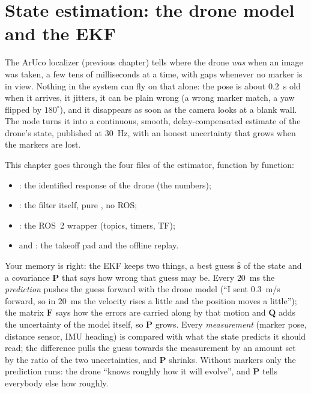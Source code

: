 \chapter{State estimation: the drone model and the EKF}
\label{ch:ekf}
\sloppy

The ArUco localizer (previous chapter) tells where the drone \emph{was} when an image was taken, a few tens of
milliseconds at a time, with gaps whenever no marker is in view. Nothing in the system can fly on that alone: the pose
is about $0.2$~s old when it arrives, it jitters, it can be plain wrong (a wrong marker match, a yaw flipped by
$180^\circ$), and it disappears as soon as the camera looks at a blank wall. The node  turns it into a
continuous, smooth, delay-compensated estimate of the drone's state, published at $30$~Hz, with an honest uncertainty
that grows when the markers are lost.

This chapter goes through the four files of the estimator, function by function:
\begin{itemize}[nosep]
  \item {}: the identified response of the drone (the numbers);
  \item {}: the filter itself, pure , no ROS;
  \item {}: the ROS~2 wrapper (topics, timers, TF);
  \item {} and : the takeoff pad and the offline replay.
\end{itemize}

\begin{intuition}
Your memory is right: the EKF keeps two things, a best guess $\hat{\mathbf s}$ of the state and a covariance
$\mathbf P$ that says how wrong that guess may be. Every $20$~ms the \emph{prediction} pushes the guess forward with
the drone model (``I sent $0.3$~m/s forward, so in $20$~ms the velocity rises a little and the position moves a
little''); the matrix $\mathbf F$ says how the errors are carried along by that motion and $\mathbf Q$ adds the
uncertainty of the model itself, so $\mathbf P$ grows. Every \emph{measurement} (marker pose, distance sensor, IMU
heading) is compared with what the state predicts it should read; the difference pulls the guess towards the
measurement by an amount set by the ratio of the two uncertainties, and $\mathbf P$ shrinks. Without markers only the
prediction runs: the drone ``knows roughly how it will evolve'', and $\mathbf P$ tells everybody else how roughly.
\end{intuition}


